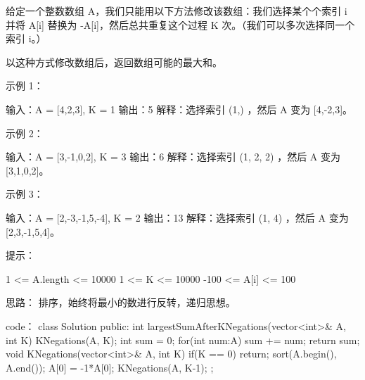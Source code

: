 给定一个整数数组 A，我们只能用以下方法修改该数组：我们选择某个个索引 i 并将 A[i] 替换为 -A[i]，然后总共重复这个过程 K 次。（我们可以多次选择同一个索引 i。）

以这种方式修改数组后，返回数组可能的最大和。

 

示例 1：

输入：A = [4,2,3], K = 1
输出：5
解释：选择索引 (1,) ，然后 A 变为 [4,-2,3]。

示例 2：

输入：A = [3,-1,0,2], K = 3
输出：6
解释：选择索引 (1, 2, 2) ，然后 A 变为 [3,1,0,2]。

示例 3：

输入：A = [2,-3,-1,5,-4], K = 2
输出：13
解释：选择索引 (1, 4) ，然后 A 变为 [2,3,-1,5,4]。

 

提示：

    1 <= A.length <= 10000
    1 <= K <= 10000
    -100 <= A[i] <= 100






















思路：
排序，始终将最小的数进行反转，递归思想。































code：
class Solution {
public:
    int largestSumAfterKNegations(vector<int>& A, int K) {
        KNegations(A, K);
        int sum = 0;
        for(int num:A)
            sum += num;
        return sum;
    }
    void KNegations(vector<int>& A, int K)
    {
        if(K == 0) return;
        sort(A.begin(), A.end());
        A[0] = -1*A[0];
        KNegations(A, K-1);
    }
};